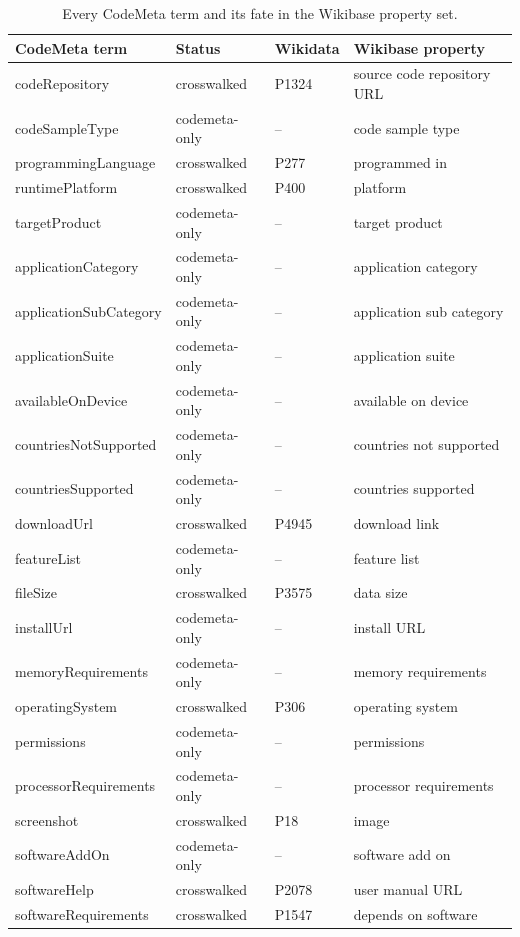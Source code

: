 \begin{longtable}{llll}
\caption{Every CodeMeta term and its fate in the Wikibase property set.}\label{tab:codemeta-terms}\\
\hline
CodeMeta term & Status & Wikidata & Wikibase property \\ \hline \endhead
codeRepository & crosswalked & P1324 & source code repository URL \\
codeSampleType & codemeta-only & -- & code sample type \\
programmingLanguage & crosswalked & P277 & programmed in \\
runtimePlatform & crosswalked & P400 & platform \\
targetProduct & codemeta-only & -- & target product \\
applicationCategory & codemeta-only & -- & application category \\
applicationSubCategory & codemeta-only & -- & application sub category \\
applicationSuite & codemeta-only & -- & application suite \\
availableOnDevice & codemeta-only & -- & available on device \\
countriesNotSupported & codemeta-only & -- & countries not supported \\
countriesSupported & codemeta-only & -- & countries supported \\
downloadUrl & crosswalked & P4945 & download link \\
featureList & codemeta-only & -- & feature list \\
fileSize & crosswalked & P3575 & data size \\
installUrl & codemeta-only & -- & install URL \\
memoryRequirements & codemeta-only & -- & memory requirements \\
operatingSystem & crosswalked & P306 & operating system \\
permissions & codemeta-only & -- & permissions \\
processorRequirements & codemeta-only & -- & processor requirements \\
screenshot & crosswalked & P18 & image \\
softwareAddOn & codemeta-only & -- & software add on \\
softwareHelp & crosswalked & P2078 & user manual URL \\
softwareRequirements & crosswalked & P1547 & depends on software \\

\end{longtable}
